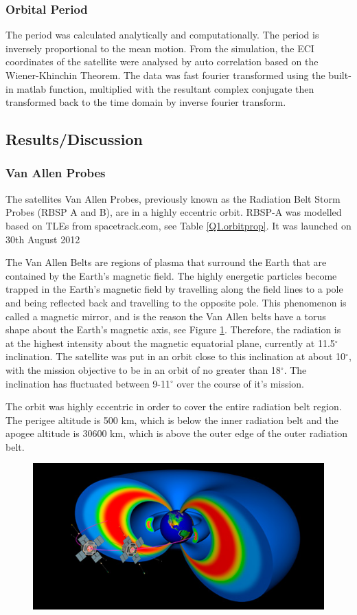 \documentclass[Space3_Assign1.tex]{subfiles}
\begin{document}
\subsubsection{Orbital Period}
The period was calculated analytically and computationally. The period is inversely proportional to the mean motion. From the simulation, the ECI coordinates of the satellite were analysed by auto correlation based on the Wiener-Khinchin Theorem. The data was fast fourier transformed using the built-in matlab function, multiplied with the resultant complex conjugate then transformed back to the time domain by inverse fourier transform. 


\subsection{Results/Discussion}
\subsubsection{Van Allen Probes}
The satellites Van Allen Probes, previously known as the Radiation Belt Storm Probes (RBSP A and B), are in a highly eccentric orbit. RBSP-A was modelled based on TLEs from spacetrack.com, see Table \ref{Q1.orbitprop}. It was launched on 30th August 2012 

The Van Allen Belts are regions of plasma that surround the Earth that are contained by the Earth's magnetic field. The highly energetic particles become trapped in the Earth's magnetic field by travelling along the field lines to a pole and being reflected back and travelling to the opposite pole. This phenomenon is called a magnetic mirror, and is the reason the Van Allen belts have a torus shape about the Earth's magnetic axis, see Figure \ref{fig:VanAllenNASA}. Therefore, the radiation is at the highest intensity about the magnetic equatorial plane, currently at 11.5$^{\circ}$ inclination. The satellite was put in an orbit close to this inclination at about 10$^{\circ}$, with the mission objective to be in an orbit of no greater than 18$^{\circ}$. The inclination has fluctuated between 9-11$^{\circ}$ over the course of it's mission.

The orbit was highly eccentric in order to cover the entire radiation belt region. The perigee altitude is 500 km, which is below the inner radiation belt and the apogee altitude is 30600 km, which is above the outer edge of the outer radiation belt.
\begin{figure}
\centering
\includegraphics[width=0.7\linewidth]{VanAllenNASA}
\caption{}
\label{fig:VanAllenNASA}
\end{figure}
\end{document}

